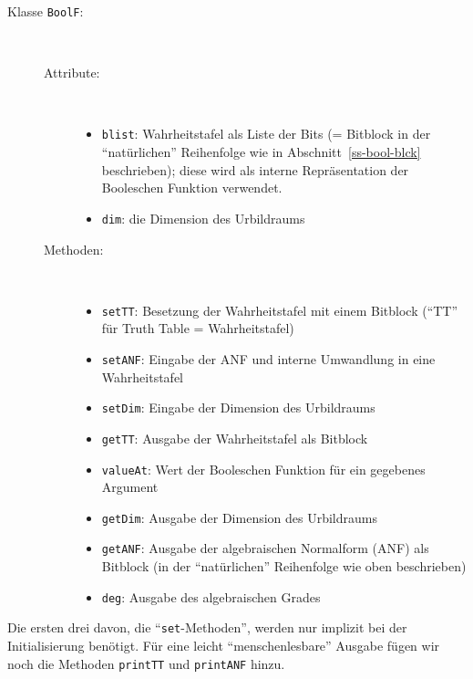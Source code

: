 \begin{refsegment}
\begin{description}
   \item[Klasse {\tt BoolF}:] ~
      \begin{description}
         \item[Attribute:] ~
            \begin{itemize}
               \item {\tt blist}: Wahrheitstafel als Liste
                  der Bits (= Bitblock in der "`natürlichen"' Reihenfolge wie in
                  Abschnitt~\ref{ss-bool-blck} beschrieben);
                  diese wird als interne Repräsentation der Booleschen Funktion
                  verwendet.
               \item {\tt dim}: die Dimension des Urbildraums
            \end{itemize}
         \item[Methoden:] ~
            \begin{itemize}
               \item {\tt setTT}: Besetzung der Wahrheitstafel mit einem Bitblock
                  ("`TT"' für Truth Table = Wahrheitstafel)
               \item {\tt setANF}: Eingabe der ANF und interne Umwandlung in
                  eine Wahrheitstafel
               \item {\tt setDim}: Eingabe der Dimension des Urbildraums
               \item {\tt getTT}: Ausgabe der Wahrheitstafel als Bitblock
               \item {\tt valueAt}: Wert der Booleschen Funktion für ein gegebenes Argument
               \item {\tt getDim}: Ausgabe der Dimension des Urbildraums
               \item {\tt getANF}: Ausgabe der algebraischen Normalform (ANF) als
                  Bitblock (in der "`natürlichen"' Reihenfolge wie oben beschrieben)
               \item {\tt deg}: Ausgabe des algebraischen
                  Grades
            \end{itemize}
      \end{description}
\end{description}
Die ersten drei davon, die "`{\tt set}-Methoden"', werden nur implizit bei
der Initialisierung benötigt. Für eine leicht "`menschenlesbare"' Ausgabe
fügen wir noch die Methoden {\tt printTT} und {\tt printANF} hinzu.


\end{refsegment}
